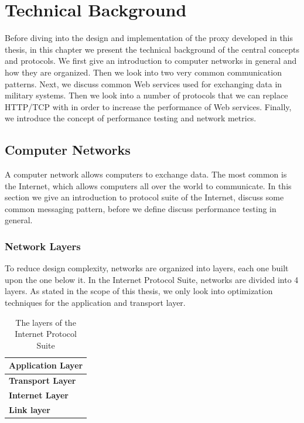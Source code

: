 \chapter{Technical Background}

\label{chapter:background}



Before diving into the design and implementation of the proxy developed in this
thesis, in this chapter we present the technical background of the central
concepts and protocols. We first give an introduction to computer networks in
general and how they are organized. Then we look into two very common
communication patterns. Next, we discuss common Web services used for exchanging
data in military systems. Then we look into a number of protocols that we can
replace HTTP/TCP with in order to increase the performance of Web services.
Finally, we introduce the concept of performance testing and network metrics.

\section{Computer Networks}

A computer network allows computers to exchange data. The most common is the
Internet, which allows computers all over the world to communicate. In this
section we give an introduction to protocol suite of the Internet, discuss some
common messaging pattern, before we define discuss performance testing in
general.

\subsection{Network Layers}

To reduce design complexity, networks are organized into layers, each one built
upon the one below it. In the Internet Protocol Suite\cite{rfc-1122}, networks
are divided into 4 layers. As stated in the scope of this thesis, we only look
into optimization techniques for the application and transport layer.

\begin{table}[h]
\begin{tabularx}{\textwidth}{| X |}
\hline
  \textbf{Application Layer} \\ \hline
  \textbf{Transport Layer} \\ \hline
  \textbf{Internet Layer} \\ \hline
  \textbf{Link layer} \\ \hline
\end{tabularx}
\caption{The layers of the Internet Protocol Suite}
\label{figure-network-layers}
\end{table}

